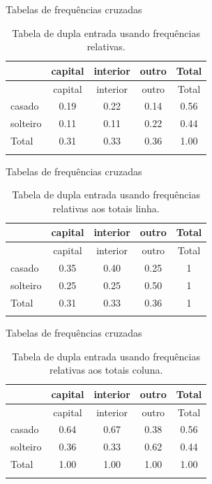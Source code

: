 \documentclass[
  ignorenonframetext,
  serif,
  professionalfont,
  usenames,
  dvipsnames,
  aspectratio = 169]{beamer}
\begin{document}
\begin{frame}{Tabelas de frequências cruzadas}
\label{tabelas-de-frequuxeancias-cruzadas-2}
\begin{longtable}[]{@{}lcccc@{}}
\caption{Tabela de dupla entrada usando frequências
relativas.}\tabularnewline
\toprule\noalign{}
& capital & interior & outro & Total \\
\midrule\noalign{}
\endfirsthead
\toprule\noalign{}
& capital & interior & outro & Total \\
\midrule\noalign{}
\endhead
casado & 0.19 & 0.22 & 0.14 & 0.56 \\
solteiro & 0.11 & 0.11 & 0.22 & 0.44 \\
Total & 0.31 & 0.33 & 0.36 & 1.00 \\
\bottomrule\noalign{}
\end{longtable}
\end{frame}

\begin{frame}{Tabelas de frequências cruzadas}
\label{tabelas-de-frequuxeancias-cruzadas-3}
\begin{longtable}[]{@{}lcccc@{}}
\caption{Tabela de dupla entrada usando frequências relativas aos totais
linha.}\tabularnewline
\toprule\noalign{}
& capital & interior & outro & Total \\
\midrule\noalign{}
\endfirsthead
\toprule\noalign{}
& capital & interior & outro & Total \\
\midrule\noalign{}
\endhead
casado & 0.35 & 0.40 & 0.25 & 1 \\
solteiro & 0.25 & 0.25 & 0.50 & 1 \\
Total & 0.31 & 0.33 & 0.36 & 1 \\
\bottomrule\noalign{}
\end{longtable}
\end{frame}

\begin{frame}{Tabelas de frequências cruzadas}
\label{tabelas-de-frequuxeancias-cruzadas-4}
\begin{longtable}[]{@{}lcccc@{}}
\caption{Tabela de dupla entrada usando frequências relativas aos totais
coluna.}\tabularnewline
\toprule\noalign{}
& capital & interior & outro & Total \\
\midrule\noalign{}
\endfirsthead
\toprule\noalign{}
& capital & interior & outro & Total \\
\midrule\noalign{}
\endhead
casado & 0.64 & 0.67 & 0.38 & 0.56 \\
solteiro & 0.36 & 0.33 & 0.62 & 0.44 \\
Total & 1.00 & 1.00 & 1.00 & 1.00 \\
\bottomrule\noalign{}
\end{longtable}
\end{frame}
\end{document}
